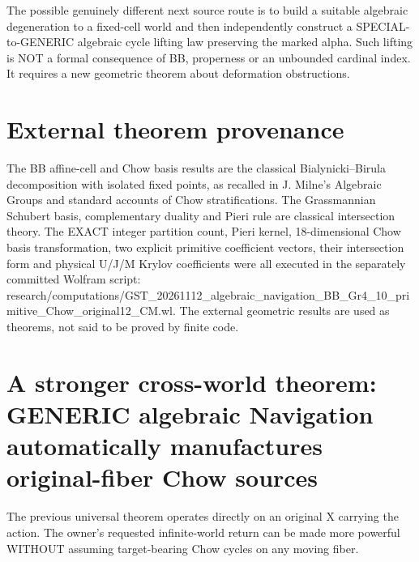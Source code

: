 \documentclass[11pt]{article}
\begin{document}
The possible genuinely different
next source route is to build
a suitable algebraic degeneration
to a fixed-cell world and then
independently construct a
SPECIAL-to-GENERIC algebraic cycle
lifting law preserving the marked
alpha. Such lifting is NOT a
formal consequence of BB, properness
or an unbounded cardinal index.
It requires a new geometric theorem
about deformation obstructions.

\section{External theorem provenance}
The BB affine-cell and Chow basis
results are the classical
Bialynicki--Birula decomposition
with isolated fixed points, as
recalled in J. Milne's Algebraic Groups
and standard accounts of Chow
stratifications. The Grassmannian
Schubert basis, complementary
duality and Pieri rule are classical
intersection theory.
The EXACT integer partition count,
Pieri kernel, 18-dimensional
Chow basis transformation,
two explicit primitive coefficient
vectors, their intersection form
and physical U/J/M Krylov
coefficients were all executed
in the separately committed
Wolfram script:
research/computations/GST_20261112_algebraic_navigation_BB_Gr4_10_primitive_Chow_original12_CM.wl.
The external geometric results are
used as theorems, not said to be
proved by finite code.

\section{A stronger cross-world theorem: GENERIC algebraic Navigation automatically manufactures original-fiber Chow sources}
The previous universal theorem operates directly
on an original X carrying the action.
The owner's requested infinite-world
return can be made more powerful WITHOUT
assuming target-bearing Chow cycles on
any moving fiber.
\end{document}
